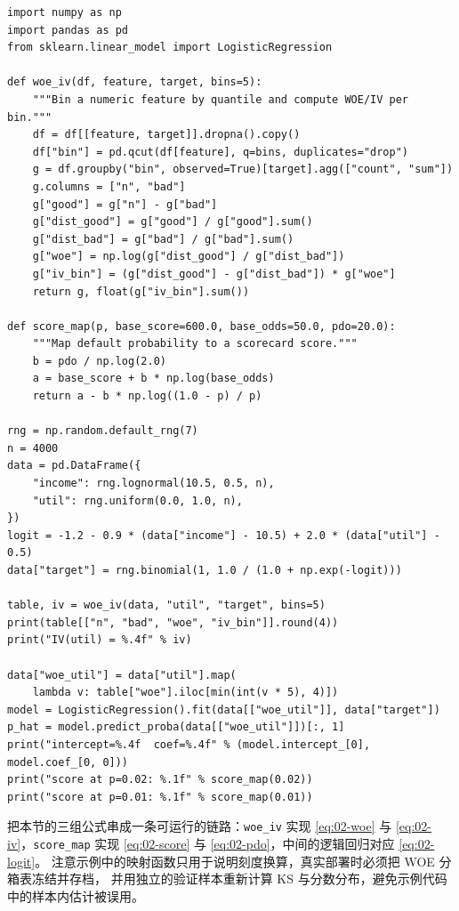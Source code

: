 \begin{lstlisting}[style=pythonstyle,
                   caption={评分卡流程：分箱、WOE 与 IV、逻辑回归与评分刻度映射},
                   label={lst:02-scorecard}]
import numpy as np
import pandas as pd
from sklearn.linear_model import LogisticRegression

def woe_iv(df, feature, target, bins=5):
    """Bin a numeric feature by quantile and compute WOE/IV per bin."""
    df = df[[feature, target]].dropna().copy()
    df["bin"] = pd.qcut(df[feature], q=bins, duplicates="drop")
    g = df.groupby("bin", observed=True)[target].agg(["count", "sum"])
    g.columns = ["n", "bad"]
    g["good"] = g["n"] - g["bad"]
    g["dist_good"] = g["good"] / g["good"].sum()
    g["dist_bad"] = g["bad"] / g["bad"].sum()
    g["woe"] = np.log(g["dist_good"] / g["dist_bad"])
    g["iv_bin"] = (g["dist_good"] - g["dist_bad"]) * g["woe"]
    return g, float(g["iv_bin"].sum())

def score_map(p, base_score=600.0, base_odds=50.0, pdo=20.0):
    """Map default probability to a scorecard score."""
    b = pdo / np.log(2.0)
    a = base_score + b * np.log(base_odds)
    return a - b * np.log((1.0 - p) / p)

rng = np.random.default_rng(7)
n = 4000
data = pd.DataFrame({
    "income": rng.lognormal(10.5, 0.5, n),
    "util": rng.uniform(0.0, 1.0, n),
})
logit = -1.2 - 0.9 * (data["income"] - 10.5) + 2.0 * (data["util"] - 0.5)
data["target"] = rng.binomial(1, 1.0 / (1.0 + np.exp(-logit)))

table, iv = woe_iv(data, "util", "target", bins=5)
print(table[["n", "bad", "woe", "iv_bin"]].round(4))
print("IV(util) = %.4f" % iv)

data["woe_util"] = data["util"].map(
    lambda v: table["woe"].iloc[min(int(v * 5), 4)])
model = LogisticRegression().fit(data[["woe_util"]], data["target"])
p_hat = model.predict_proba(data[["woe_util"]])[:, 1]
print("intercept=%.4f  coef=%.4f" % (model.intercept_[0], model.coef_[0, 0]))
print("score at p=0.02: %.1f" % score_map(0.02))
print("score at p=0.01: %.1f" % score_map(0.01))
\end{lstlisting}

 把本节的三组公式串成一条可运行的链路：\texttt{woe\_iv}
实现 \cref{eq:02-woe} 与 \cref{eq:02-iv}，\texttt{score\_map} 实现
\cref{eq:02-score} 与 \cref{eq:02-pdo}，中间的逻辑回归对应 \cref{eq:02-logit}。
注意示例中的映射函数只用于说明刻度换算，真实部署时必须把 WOE 分箱表冻结并存档，
并用独立的验证样本重新计算 KS 与分数分布，避免示例代码中的样本内估计被误用。

